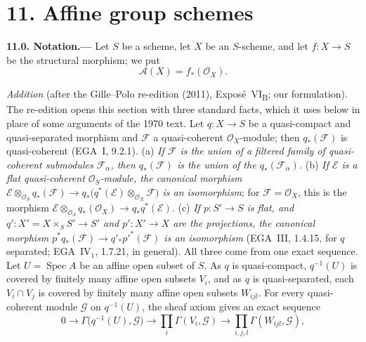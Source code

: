 
\section*{11. Affine group schemes}
\label{sec:sga3-VIB-11}%

\medskip
{}\label{par:sga3-VIB-11.0}%
\noindent\textbf{11.0. Notation.---}
Let \(S\) be a scheme, let \(X\) be an \(S\)-scheme, and let
\(f:X\to S\) be the structural morphism; we put
\label{form:sga3-VIB-11-A-X}%
\[
  \mathcal A(X)=f_*(\mathcal O_X).
\]

\par\medskip\noindent
\emph{Addition} (after the Gille--Polo re-edition (2011), Expos\'e~VI\textsubscript{B}; our formulation).
The re-edition opens this section with three standard facts, which it uses below in place of some arguments
of the 1970 text. Let \(q\colon X\to S\) be a quasi-compact and quasi-separated morphism and \(\mathcal F\) a
quasi-coherent \(\mathcal O_X\)-module; then \(q_*(\mathcal F)\) is quasi-coherent (EGA~I, 9.2.1).
\label{concl:sga3-VIB-11.0-a}%
(a) \emph{If \(\mathcal F\) is the union of a filtered family of quasi-coherent submodules
\(\mathcal F_\alpha\), then \(q_*(\mathcal F)\) is the union of the \(q_*(\mathcal F_\alpha)\).}
\label{concl:sga3-VIB-11.0-b}%
(b) \emph{If \(\mathcal E\) is a flat quasi-coherent \(\mathcal O_S\)-module, the canonical morphism
\(\mathcal E\otimes_{\mathcal O_S}q_*(\mathcal F)\to q_*\bigl(q^*(\mathcal E)\otimes_{\mathcal O_X}\mathcal F\bigr)\)
is an isomorphism}; for \(\mathcal F=\mathcal O_X\), this is the morphism
\(\mathcal E\otimes_{\mathcal O_S}q_*(\mathcal O_X)\to q_*q^*(\mathcal E)\).
\label{concl:sga3-VIB-11.0-c}%
(c) \emph{If \(p\colon S'\to S\) is flat, and \(q'\colon X'=X\times_SS'\to S'\) and \(p'\colon X'\to X\) are
the projections, the canonical morphism \(p^*q_*(\mathcal F)\to q'_*p'^*(\mathcal F)\) is an isomorphism}
(EGA~III, 1.4.15, for \(q\) separated; EGA~IV\(_1\), 1.7.21, in general).
All three come from one exact sequence. Let \(U=\operatorname{Spec}A\) be an affine open subset of \(S\). As
\(q\) is quasi-compact, \(q^{-1}(U)\) is covered by finitely many affine open subsets \(V_i\), and as \(q\) is
quasi-separated, each \(V_i\cap V_j\) is covered by finitely many affine open subsets \(W_{ijl}\). For every
quasi-coherent module \(\mathcal G\) on \(q^{-1}(U)\), the sheaf axiom gives an exact sequence
\[
  0\longrightarrow\Gamma\bigl(q^{-1}(U),\mathcal G\bigr)\longrightarrow\prod_i\Gamma(V_i,\mathcal G)
   \longrightarrow\prod_{i,j,l}\Gamma(W_{ijl},\mathcal G),
\]
